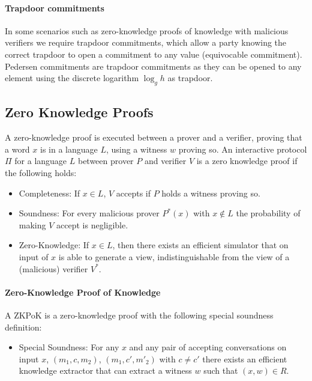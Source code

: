 \paragraph{Trapdoor commitments}
In some scenarios such as zero-knowledge proofs of knowledge with malicious verifiers we require trapdoor commitments, which allow a party knowing the correct trapdoor to open a commitment to any value (equivocable commitment).
Pedersen commitments are trapdoor commitments as they can be opened to any element using the discrete logarithm $\log_g h$ as trapdoor.

\subsection{Zero Knowledge Proofs}
A zero-knowledge proof is executed between a prover and a verifier, proving that a word $x$ is in a language $L$, using a witness $w$ proving so.
An interactive protocol $\Pi$ for a language $L$ between prover $P$ and verifier $V$ is a zero knowledge proof if the following holds:
\begin{itemize}
	\item Completeness: If $x\in L$, $V$ accepts if $P$ holds a witness proving so.
	\item Soundness: For every malicious prover $P^\ast(x)$ with $x\not\in L$ the probability of making $V$ accept is negligible.
	\item Zero-Knowledge: If $x\in L$, then there exists an efficient simulator \Sim that on input of $x$ is able to generate a view, indistinguishable from the view of a (malicious) verifier $V^\ast$.
\end{itemize}

\paragraph{Zero-Knowledge Proof of Knowledge}
A \ac{ZKPoK} is a zero-knowledge proof with the following special soundness definition:
\begin{itemize}
	\item Special Soundness: For any $x$ and any pair of accepting conversations on input $x$, $(m_1, c, m_2)$, $(m_1, c', m'_2)$ with $c\not= c'$ there exists an efficient knowledge extractor \Ext that can extract a witness $w$ such that $(x,w)\in R$.
\end{itemize}

